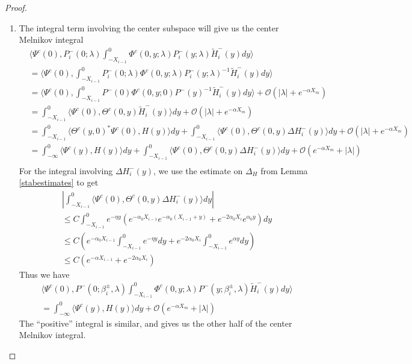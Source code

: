 \documentclass[thesis.tex]{subfiles}
\begin{document}
\begin{lemma}
\begin{proof}
\begin{enumerate}
\item The integral term involving the center subspace will give us the center Melnikov integral
\begin{align*}
&\langle \Psi^c(0), P_i^-(0; \lambda) \int_{-X_{i-1}}^0 \Phi^c(0, y; \lambda) P_i^-(y; \lambda) \tilde{H}_i^-(y) dy \rangle \\
&= \langle \Psi^c(0), \int_{-X_{i-1}}^0 P_i^-(0; \lambda) \Phi^c(0, y; \lambda) P_i^-(y; \lambda)^{-1} \tilde{H}_i^-(y) dy \rangle \\
&= \langle \Psi^c(0), \int_{-X_{i-1}}^0 P^-(0) \Phi^c(0, y; 0) P^-(y)^{-1} \tilde{H}_i^-(y) dy \rangle + \mathcal{O}(|\lambda| + e^{-\alpha X_m}) \\
&= \int_{-X_{i-1}}^0 \langle \Psi^c(0), \Theta^c(0, y) \tilde{H}_i^-(y) \rangle dy + \mathcal{O}(|\lambda| + e^{-\alpha X_m}) \\
&= \int_{-X_{i-1}}^0 \langle \Theta^c(y, 0)^* \Psi^c(0), H(y) \rangle dy + \int_{-X_{i-1}}^0 \langle \Psi^c(0), \Theta^c(0, y) \Delta H_i^-(y) \rangle dy + \mathcal{O}(|\lambda| + e^{-\alpha X_m}) \\
&= \int_{-\infty}^0 \langle \Psi^c(y), H(y) \rangle dy + \int_{-X_{i-1}}^0 \langle \Psi^c(0), \Theta^c(0, y) \Delta H_i^-(y) \rangle dy + \mathcal{O}(e^{-\alpha X_m} + |\lambda|) \\
\end{align*}
For the integral involving $\Delta H_i^-(y)$, we use the estimate on $\Delta_H$ from Lemma \ref{stabestimates} to get
\begin{align*}
&\left| \int_{-X_{i-1}}^0 \langle \Psi^c(0), \Theta^c(0, y) \Delta H_i^-(y) \rangle dy \right| \\
&\leq C \int_{-X_{i-1}}^0 e^{-\eta y}\left( e^{-\alpha_0 X_{i-1}} e^{-\alpha_0(X_{i-1} + y)} + e^{-2 \alpha_0 X_i} e^{\alpha_0 y} \right) dy \\
&\leq C \left( e^{-\alpha_0 X_{i-1}} \int_{-X_{i-1}}^0 e^{-\eta y} dy + e^{-2 \alpha_0 X_i} \int_{-X_{i-1}}^0 e^{\alpha y} dy \right) \\
&\leq C\left( e^{-\alpha X_{i-1}} + e^{-2 \alpha_0 X_i} \right)
\end{align*}
Thus we have
\begin{align*}
&\langle \Psi^c(0), P^-(0; \beta_i^\pm, \lambda) \int_{-X_{i-1}}^0 \Phi^c(0, y; \lambda) P^-(y; \beta_i^\pm, \lambda) \tilde{H}_i^-(y) dy \rangle \\
&= \int_{-\infty}^0 \langle \Psi^c(y), H(y) \rangle dy + \mathcal{O}(e^{-\alpha X_m} + |\lambda|) 
\end{align*}
The ``positive'' integral is similar, and gives us the other half of the center Melnikov integral.
\end{enumerate}


\end{proof}
\end{lemma}
\end{document}

